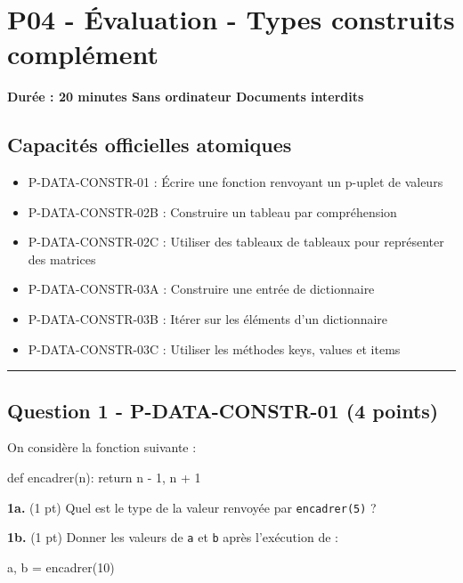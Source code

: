 \section{P04 - Évaluation - Types construits complément}

\textbf{Durée : 20 minutes \textbar{} Sans ordinateur \textbar{}
Documents interdits}

\subsection{Capacités officielles atomiques}

\begin{itemize}
\tightlist
\item
  P-DATA-CONSTR-01 : Écrire une fonction renvoyant un p-uplet de valeurs
\item
  P-DATA-CONSTR-02B : Construire un tableau par compréhension
\item
  P-DATA-CONSTR-02C : Utiliser des tableaux de tableaux pour représenter
  des matrices
\item
  P-DATA-CONSTR-03A : Construire une entrée de dictionnaire
\item
  P-DATA-CONSTR-03B : Itérer sur les éléments d'un dictionnaire
\item
  P-DATA-CONSTR-03C : Utiliser les méthodes keys, values et items
\end{itemize}

\begin{center}\rule{0.5\linewidth}{0.5pt}\end{center}

\subsection{Question 1 - P-DATA-CONSTR-01 (4 points)}

On considère la fonction suivante :

\begin{python}
def encadrer(n):
    return n - 1, n + 1
\end{python}

\textbf{1a.} (1 pt) Quel est le type de la valeur renvoyée par
\texttt{encadrer(5)} ?

\textbf{1b.} (1 pt) Donner les valeurs de \texttt{a} et \texttt{b} après
l'exécution de :

\begin{python}
a, b = encadrer(10)
\end{python}


